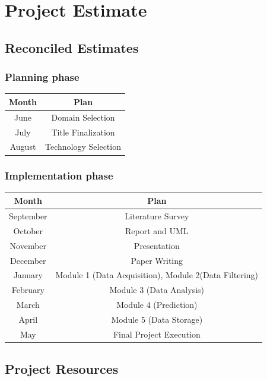 \documentclass[oneside,a4paper,12pt]{book}
\begin{document}
\section{Project Estimate}
\subsection{Reconciled Estimates}
\subsubsection{Planning phase}
\begin{center}
 \begin{tabular}{||c || c ||} 
 \hline
 Month & Plan \\ [1.5ex] 
 \hline\hline
 June & Domain Selection \\ 
 \hline
 July & Title Finalization \\
 \hline
 August & Technology Selection \\ [1.5ex]
 \hline
\end{tabular}
\end{center}
\subsubsection{Implementation phase}
\begin{center}
 \begin{tabular}{||c || c ||} 
 \hline
 Month & Plan \\ [1.5ex] 
 \hline\hline
 September & Literature Survey \\ 
 \hline
 October & Report and UML \\
 \hline
 November & Presentation \\
 \hline
  December & Paper Writing \\ 
 \hline
 January & Module 1 (Data Acquisition), Module 2(Data Filtering)\\
 \hline
 February & Module 3 (Data Analysis) \\
 \hline
 March & Module 4 (Prediction) \\ 
 \hline
 April & Module 5 (Data Storage) \\
 \hline
 May & Final Project Execution \\ [1.5ex]
 \hline
\end{tabular}
\end{center}
\subsection{Project Resources}
\end{document}
